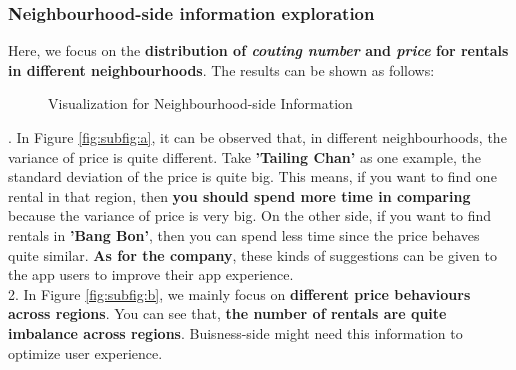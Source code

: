 \documentclass{article}
\begin{document}
	\subsubsection{Neighbourhood-side information exploration}
	Here, we focus on the \textbf{distribution of\textit{ couting number} and \textit{price} for rentals in different neighbourhoods}. The results can be shown as follows:
	\begin{figure}[h]
		\centering
		\caption{Visualization for Neighbourhood-side Information}
		\label{fig:005} %
	\end{figure}
	\newpage
	. In Figure \ref{fig:subfig:a}, it can be observed that, in different neighbourhoods, the variance of price is quite different. Take\textbf{ 'Tailing Chan' }as one example, the standard deviation of the price is quite big. This means, if you want to find one rental in that region, then \textbf{you should spend more time in comparing} because the variance of price is very big. On the other side, if you want to find rentals in \textbf{'Bang Bon'}, then you can spend less time since the price behaves quite similar. \textbf{As for the company}, these kinds of suggestions can be given to the app users to improve their app experience. 
	\\
	2. In Figure \ref{fig:subfig:b}, we mainly focus on \textbf{different price behaviours across regions}. You can see that,\textbf{ the number of rentals are quite imbalance across regions}. Buisness-side might need this information to optimize user experience.
\end{document}
